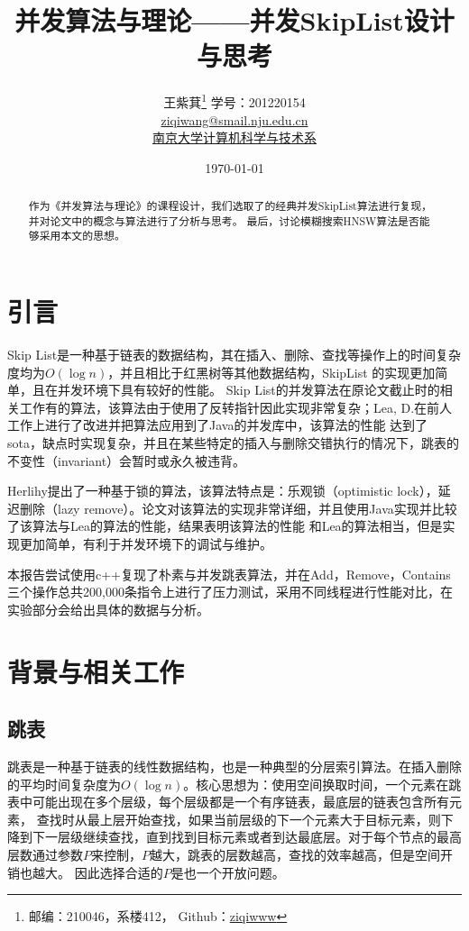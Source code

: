 \documentclass[UTF8, 10pt, twocolumn]{article}
\title{并发算法与理论——并发SkipList设计与思考}
\author{王紫萁\thanks{邮编：210046，系楼412， Github：\href{https://github.com/ziqiwww}{ziqiwww}} \quad 学号：201220154 \\
\href{mailto:ziqiwang@smail.nju.edu.cn}{ziqiwang@smail.nju.edu.cn} \\
\href{cs.nju.edu.cn}{南京大学计算机科学与技术系}
}
\date{ \today}
\begin{document}
\maketitle
\begin{abstract}
  作为《并发算法与理论》的课程设计，我们选取了\cite[Herlihy]{prencipe_simple_2007}的经典并发SkipList算法进行复现，并对论文中的概念与算法进行了分析与思考。
  最后，讨论模糊搜索HNSW算法\cite[Malkov]{malkov_efficient_2020}是否能够采用本文的思想。
\end{abstract}

\section{引言}
Skip List是一种基于链表的数据结构，其在插入、删除、查找等操作上的时间复杂度均为$O(\log n)$，并且相比于红黑树等其他数据结构，SkipList 的实现更加简单，且在并发环境下具有较好的性能。
Skip List的并发算法在原论文截止时的相关工作有\cite[Pugh]{pugh_skip_1990}的算法，该算法由于使用了反转指针因此实现非常复杂；Lea, D.在前人工作上进行了改进并把算法应用到了Java的并发库中，该算法的性能
达到了sota，缺点时实现复杂，并且在某些特定的插入与删除交错执行的情况下，跳表的不变性（invariant）会暂时或永久被违背。

Herlihy提出了一种基于锁的算法，该算法特点是：乐观锁（optimistic lock），延迟删除（lazy remove）。论文对该算法的实现非常详细，并且使用Java实现并比较了该算法与Lea的算法的性能，结果表明该算法的性能
和Lea的算法相当，但是实现更加简单，有利于并发环境下的调试与维护。

本报告尝试使用c++复现了朴素与并发跳表算法，并在Add，Remove，Contains三个操作总共200,000条指令上进行了压力测试，采用不同线程进行性能对比，在实验部分会给出具体的数据与分析。

\section{背景与相关工作}
\subsection{跳表}
跳表是一种基于链表的线性数据结构，也是一种典型的分层索引算法。在插入删除的平均时间复杂度为$O(\log n)$。核心思想为：使用空间换取时间，一个元素在跳表中可能出现在多个层级，每个层级都是一个有序链表，最底层的链表包含所有元素，
查找时从最上层开始查找，如果当前层级的下一个元素大于目标元素，则下降到下一层级继续查找，直到找到目标元素或者到达最底层。对于每个节点的最高层数通过参数$P$来控制，$P$越大，跳表的层数越高，查找的效率越高，但是空间开销也越大。
因此选择合适的$P$是也一个开放问题。
\end{document}
